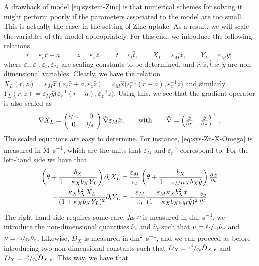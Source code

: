 \documentclass[a4paper,doc,11pt]{article}
\begin{document}
A drawback of model \eqref{eq:system-Zinc} is that numerical schemes for solving it might perform poorly if the parameters associated to the model are too small. This is actually the case, in the setting of Zinc uptake. As a result, we will scale the variables of the model appropriately. For this end, we introduce the following relations
\[
    r = \varepsilon_r \hat{r} + a,
    \qquad
    z = \varepsilon_z \hat{z},
    \qquad
    t = \varepsilon_t \hat{t},
    \qquad
    X_L = \varepsilon_M \hat{x},
    \qquad
    Y_L = \varepsilon_M \hat{y};
\]
where \( \varepsilon_r, \varepsilon_z, \varepsilon_t, \varepsilon_M\) are scaling constants to be determined, and \(\hat{r}, \hat z, \hat t, \hat x, \hat y\) are non-dimensional variables.
Clearly, we have the relation \(X_L(r,z) = \varepsilon_M \hat{x} (\varepsilon_r \hat r + a, \varepsilon_z \hat z) = \varepsilon_M \hat{x} \big( \varepsilon_r^{-1} (r-a) , \varepsilon_z^{-1} z\big) \) and similarly \(Y_L (r,z) = \varepsilon_M \hat{y} \big( \varepsilon_r^{-1} (r-a), \varepsilon_z^{-1} z \big)\). Using this, we see that the gradient operator is also scaled as
\[
    \nabla X_L =
    \begin{pmatrix}
        \nicefrac{1}{\varepsilon_r} & 0 \\
        0 & \nicefrac{1}{\varepsilon_z}
    \end{pmatrix}
    \hat{\nabla} \varepsilon_M \hat{x},
    \qquad \text{with} \qquad
    \hat{\nabla} = 
    \begin{pmatrix}
        \pd{ }{\hat r}
        &
        \pd{ }{\hat z}
    \end{pmatrix}^\top .
\]
The scaled equations are easy to determine. For instance,  \eqref{eq:sys-Zn-X-Omega} is measured in \si{M.s^{-1}}, which are the units that \(\varepsilon_M\) and \(\varepsilon_t^{-1}\) correspond to. For the left-hand side we have that
\begin{align}
    \left( \theta + \frac{b_X}{1 + \kappa_X b_X Y_L} \right) \partial_t X_L &= \frac{\varepsilon_M}{\varepsilon_t} \left( \theta + \frac{b_X}{1 + \varepsilon_M \kappa_X b_X \hat{y}} \right)  \pd{\hat{x}}{\hat{t}}
    \\
    - \frac{\kappa_X b_X^2 X_L}{(1+\kappa_X b_X Y_L)^2} \partial_t Y_L &=
    -\frac{\varepsilon_M}{\varepsilon_t} \frac{\varepsilon_M \kappa_X b_X^2 \hat{x}}{(1+\kappa_X b_X \varepsilon_M \hat{y})^2} \pd{\hat y}{\hat t}
\end{align}
The right-hand side requires some care. As \(\nu\) is measured in \si{dm.s^{-1}}, we introduce the non-dimensional quantities \( \hat{\nu}_r\) and \( \hat{\nu}_z\) such that \( \nu = \nicefrac{\varepsilon_r}{\varepsilon_t} \hat{\nu}_r \) and \( \nu = \nicefrac{\varepsilon_z}{\varepsilon_t} \hat{\nu}_z \). Likewise, \(D_X\) is measured in \si{dm^2.s^{-1}}, and we can proceed as before introducing two non-dimensional constants such that \(D_{X} = \nicefrac{\varepsilon_r^2}{\varepsilon_t} \hat{D}_{X,r}\) and \(D_{X} = \nicefrac{\varepsilon_z^2}{\varepsilon_t} \hat{D}_{X,z}\). This way, we have that
\end{document}
